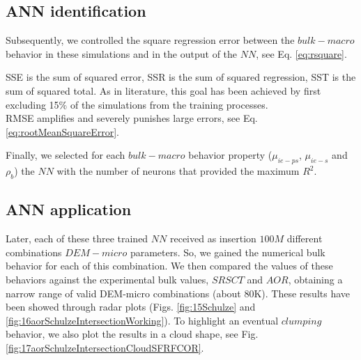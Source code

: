 \subsection{ANN identification}
\label{subsec:annmodeliden}
Subsequently, we controlled the square regression error between the $bulk-macro$
behavior in these simulations and in the output of the $NN$, see Eq.
\ref{eq:rsquare}.

SSE is the sum of squared error, SSR is the sum of squared regression, SST is
the sum of squared total.
As in literature, this goal has been achieved by first excluding 15\% of the
simulations from the training processes.\\

RMSE amplifies and severely punishes large errors, see Eq.
\ref{eq:rootMeanSquareError}.



Finally, we selected for each $bulk-macro$ behavior property ($\mu_{ie-ps}$, $\mu_{ie-s}$ and $\rho_b$) the $NN$ with the 
number of neurons that provided the maximum $R^2$.


% 

\subsection{ANN application}
\label{subsec:annapplication}

Later, each of these three trained $NN$ received as insertion $100M$ different
combinations $DEM-micro$ parameters.
So, we gained the numerical bulk behavior for each of this combination. 
We then compared the values of these behaviors against the experimental bulk
values, $SRSCT$ and $AOR$, obtaining a narrow range of valid DEM-micro
combinations (about 80K).
These results have been showed through radar plots (Figs. \ref{fig:15Schulze}
and \ref{fig:16aorSchulzeIntersectionWorking}).
To highlight an eventual $clumping$ behavior, we also plot the results in a
cloud shape, see Fig. \ref{fig:17aorSchulzeIntersectionCloudSFRFCOR}.

%


% 

